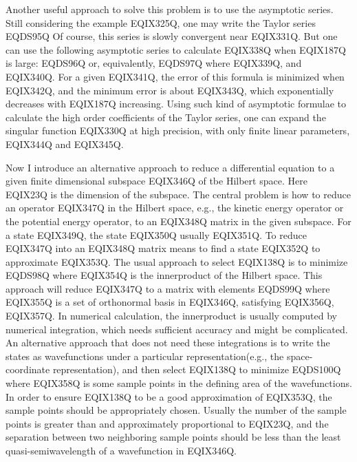 Another useful approach to solve this problem is to use the asymptotic series.
Still considering the example EQIX325Q, one may write the Taylor
series
 EQDS95Q 
Of course, this series is slowly convergent near EQIX331Q. But one can use the
following asymptotic series to calculate EQIX338Q when EQIX187Q is large:
 EQDS96Q 
or, equivalently,
 EQDS97Q 
where EQIX339Q,
and EQIX340Q. For a given EQIX341Q, the error of
this formula is minimized
when EQIX342Q, and the minimum error is about 
EQIX343Q, which exponentially decreases with EQIX187Q
increasing. Using such kind of asymptotic formulae to calculate the high order
coefficients of the Taylor series, one can expand the singular function EQIX330Q
at high precision, with only finite linear parameters, EQIX344Q and
EQIX345Q.

Now I introduce an alternative approach to reduce a differential equation to
a given finite dimensional subspace EQIX346Q of tbe Hilbert space.
Here EQIX23Q is the dimension of the subspace. The central problem is how
to reduce an operator EQIX347Q in the Hilbert
space, e.g., the kinetic energy operator or the potential energy operator,
to an EQIX348Q matrix in the given subspace. For a state
EQIX349Q, the state EQIX350Q usually
EQIX351Q. To reduce EQIX347Q into an EQIX348Q matrix means to
find a state EQIX352Q to approximate EQIX353Q. The usual approach
to select EQIX138Q is to minimize
 EQDS98Q 
where EQIX354Q is the
innerproduct of the Hilbert space. This approach will reduce EQIX347Q to a matrix
with elements
 EQDS99Q 
where EQIX355Q is a set of orthonormal basis in EQIX346Q,
satisfying EQIX356Q, EQIX357Q. In numerical
calculation, the innerproduct is usually computed by numerical integration,
which needs sufficient accuracy and might be complicated. An alternative approach
that does not need these integrations is to write the states as
wavefunctions under a particular representation(e.g., the space-coordinate
representation), and then select EQIX138Q to minimize
 EQDS100Q 
where EQIX358Q is some sample points in the defining area of the wavefunctions.
In order to ensure EQIX138Q to be a good approximation of EQIX353Q, the sample
points should be appropriately chosen. Usually the number of the sample points
is greater than and approximately proportional to EQIX23Q, and the separation between
two neighboring sample points should be less than the least quasi-semiwavelength
of a wavefunction in EQIX346Q.

